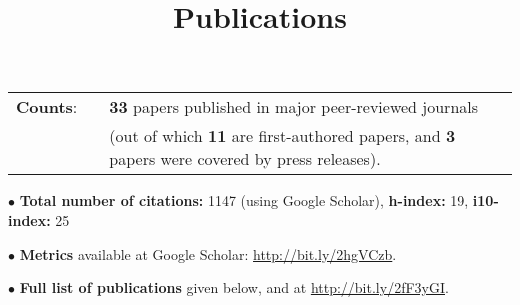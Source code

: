 \documentclass[11pt,letterpaper,sans]{moderncv}
\title{\huge{Publications}}
\begin{document}
\makecvtitle 

\vspace{-2mm}


\cvitem{}
{
\begin{tabular}{rcl}
\textbf{Counts}: &\hspace{0.3cm} &{\textbf{33} papers published in major peer-reviewed journals} \\
& &{(out of which \textbf{11} are first-authored papers, and \textbf{3} papers were covered by press releases).}
\end{tabular}
} \vspace{0.3cm}

$\bullet$ \textbf{Total number of citations:} 1147 (using Google Scholar), \textbf{h-index:} 19, \textbf{i10-index:} 25 \vspace{0.2cm}

$\bullet$ \textbf{Metrics} available at Google Scholar: {\color{color1} \href{http://bit.ly/2hgVCzb}{http://bit.ly/2hgVCzb}}. \vspace{0.2cm}

$\bullet$ \textbf{Full list of publications} given below, and at {\color{color1} \href{http://bit.ly/2fF3yGI}{http://bit.ly/2fF3yGI}}.

\vspace{0.4cm}
%
\end{document}
